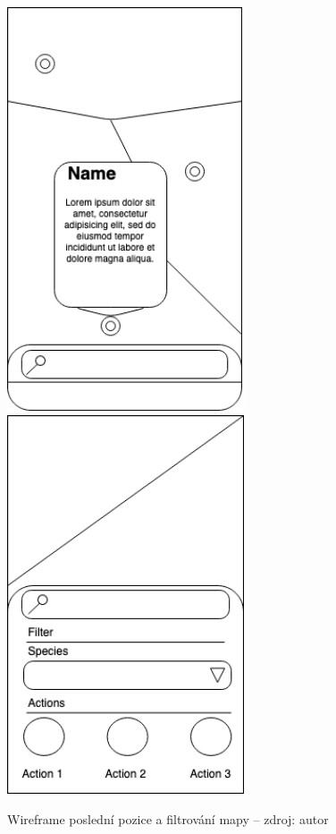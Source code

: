 \begin{figure}[H]
	\begin{center}
		\includegraphics[width=70mm]{img/wf_lastpos.png}
		\includegraphics[width=70mm]{img/wf_filter.png}
	\end{center}
	\caption[Wireframe poslední pozice a filtrování mapy]{Wireframe poslední pozice a filtrování mapy -- zdroj: autor}
\end{figure}

